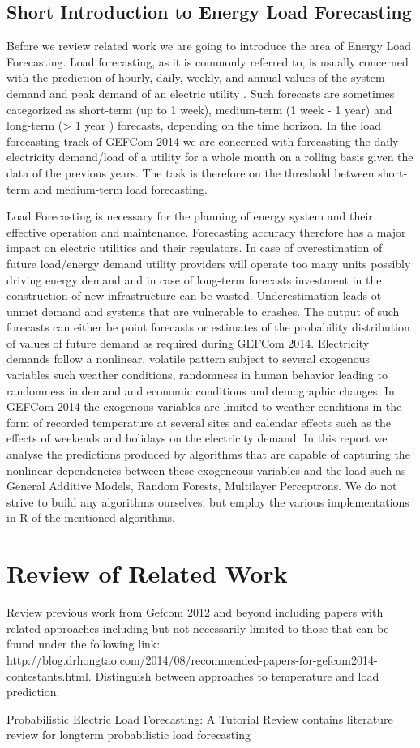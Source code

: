 \documentclass[conference]{IEEEtran}
\begin{document}
\subsection{Short Introduction to Energy Load Forecasting}
Before we review related work we are going to introduce the area of Energy Load Forecasting. Load forecasting, as it is commonly referred to, is usually concerned with the prediction of hourly, daily, weekly, and annual values of the system demand and peak demand of an electric utility \cite{Fan2010}. Such forecasts are sometimes categorized as short-term (up to 1 week), medium-term (1 week - 1 year) and long-term (> 1 year ) forecasts, depending on the time horizon. In the load forecasting track of GEFCom 2014 we are concerned with forecasting the daily electricity demand/load of a utility for a whole month on a rolling basis given the data of the previous years. The task is therefore on the threshold between short-term and medium-term load forecasting.\par
Load Forecasting is necessary for the planning of energy system and their effective operation and maintenance. Forecasting accuracy therefore has a major impact on electric utilities and their regulators. In case of overestimation of future load/energy demand utility providers will operate too many units possibly driving energy demand and in case of long-term forecasts investment in the construction of new infrastructure can be wasted. Underestimation leads ot unmet demand and systems that are vulnerable to crashes.  
The output of such forecasts can either be point forecasts or estimates of the probability distribution of values of future demand as required during GEFCom 2014.
Electricity demands follow a nonlinear, volatile pattern subject to several exogenous variables such weather conditions, randomness in human behavior leading to randomness in demand and economic conditions and demographic changes. In GEFCom 2014 the exogenous variables are limited to weather conditions in the form of recorded temperature at several sites and calendar effects such as the effects of weekends and holidays on the electricity demand.
In this report we analyse the predictions produced by algorithms that are capable of capturing the nonlinear dependencies between these exogeneous variables and the load such as General Additive Models, Random Forests, Multilayer Perceptrons. We do not strive to build any algorithms ourselves, but employ the various implementations in R of the mentioned algorithms.

\section{Review of Related Work}
Review previous work from Gefcom 2012 and beyond including papers with related approaches including but not necessarily limited to those that can be found under the following link: http://blog.drhongtao.com/2014/08/recommended-papers-for-gefcom2014-contestants.html. Distinguish between approaches to temperature and load prediction.\par
Probabilistic Electric Load Forecasting: A Tutorial Review
contains literature review for longterm probabilistic load forecasting
\end{document}
